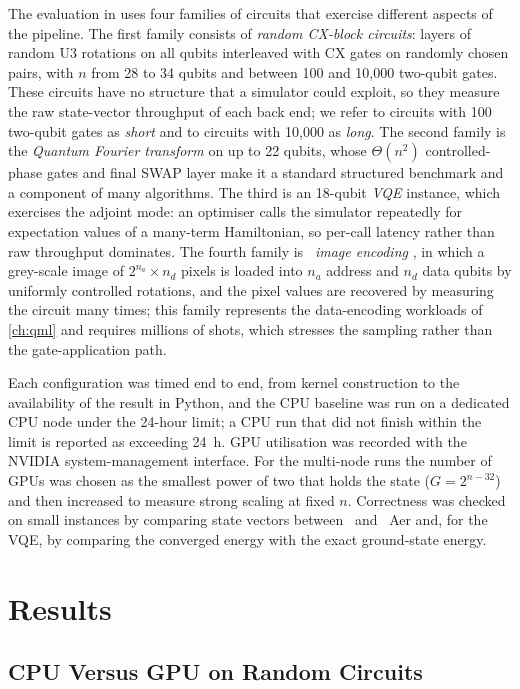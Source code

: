 The evaluation in \cite{guo2025qgear} uses four families of circuits that exercise different aspects of the pipeline. The first family consists of \emph{random CX-block circuits}: layers of random U3 rotations on all qubits interleaved with CX gates on randomly chosen pairs, with $n$ from 28 to 34 qubits and between 100 and 10,000 two-qubit gates. These circuits have no structure that a simulator could exploit, so they measure the raw state-vector throughput of each back end; we refer to circuits with 100 two-qubit gates as \emph{short} and to circuits with 10,000 as \emph{long}. The second family is the \emph{Quantum Fourier transform} on up to 22 qubits, whose $\Theta(n^{2})$ controlled-phase gates and final SWAP layer make it a standard structured benchmark and a component of many algorithms. The third is an 18-qubit \emph{VQE} instance, which exercises the adjoint mode: an optimiser calls the simulator repeatedly for expectation values of a many-term Hamiltonian, so per-call latency rather than raw throughput dominates. The fourth family is \emph{\qcrank\ image encoding} \cite{balewski2024qcrank}, in which a grey-scale image of $2^{n_{a}}\times n_{d}$ pixels is loaded into $n_{a}$ address and $n_{d}$ data qubits by uniformly controlled rotations, and the pixel values are recovered by measuring the circuit many times; this family represents the data-encoding workloads of \cref{ch:qml} and requires millions of shots, which stresses the sampling rather than the gate-application path.

Each configuration was timed end to end, from kernel construction to the availability of the result in Python, and the CPU baseline was run on a dedicated CPU node under the 24-hour limit; a CPU run that did not finish within the limit is reported as exceeding \SI{24}{\hour}. GPU utilisation was recorded with the NVIDIA system-management interface. For the multi-node runs the number of GPUs was chosen as the smallest power of two that holds the state ($G=2^{n-32}$) and then increased to measure strong scaling at fixed $n$. Correctness was checked on small instances by comparing state vectors between \qgear\ and \qiskit\ Aer and, for the VQE, by comparing the converged energy with the exact ground-state energy.

\section{Results}\label{sec:qgear:results}

\subsection{CPU Versus GPU on Random Circuits}\label{sec:qgear:results-cpu-gpu}

